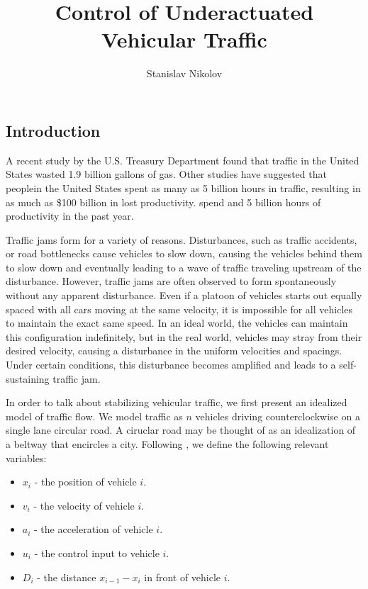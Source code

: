 \documentclass[11pt]{article}
\title{\bf Control of Underactuated Vehicular Traffic}
\author{Stanislav Nikolov}
\begin{document}
\maketitle

\begin{multicols}{2}


\section{Introduction}
A recent study by the U.S. Treasury Department found that traffic in the United States wasted 1.9 billion gallons of gas. Other studies have suggested that peoplein the United States spent as many as 5 billion hours in traffic, resulting in as much as \$100 billion in lost productivity.  spend and 5 billion hours of productivity in the past year.

Traffic jams form for a variety of reasons. Disturbances, such as traffic accidents, or road bottlenecks cause vehicles to slow down, causing the vehicles behind them to slow down and eventually leading to a wave of traffic traveling upstream of the disturbance. However, traffic jams are often observed to form spontaneously without any apparent disturbance. Even if a platoon of vehicles starts out equally spaced with all cars moving at the same velocity, it is impossible for all vehicles to maintain the exact same speed. In an ideal world, the vehicles can maintain this configuration indefinitely, but in the real world, vehicles may stray from their desired velocity, causing a disturbance in the uniform velocities and spacings. Under certain conditions, this disturbance becomes amplified and leads to a self-sustaining traffic jam. %

In order to talk about stabilizing vehicular traffic, we first present an idealized model of traffic flow. We model traffic as $n$ vehicles driving counterclockwise on a single lane circular road. A ciruclar road may be thought of as an idealization of a beltway that encircles a city. Following \cite{Peng}, we define the following relevant variables:

\begin{itemize}
\item $x_i$ - the position of vehicle $i$.
\item $v_i$ - the velocity of vehicle $i$.
\item $a_i$ - the acceleration of vehicle $i$.
\item $u_i$ - the control input to vehicle $i$.
\item $D_i$ - the distance $x_{i-1} - x_i$ in front of vehicle $i$.
\end{itemize}


\end{multicols}
\end{document}
